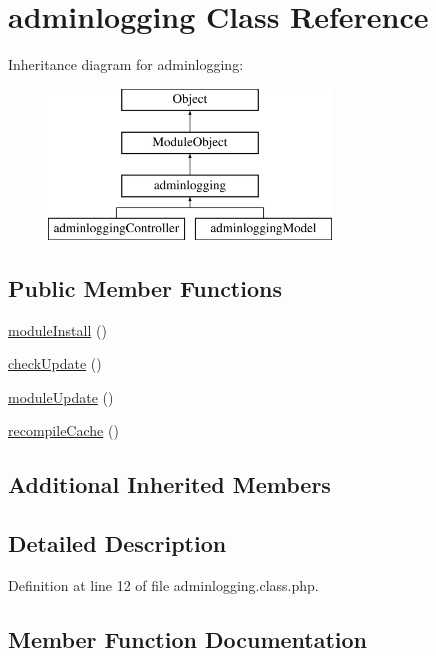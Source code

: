 \hypertarget{classadminlogging}{}\section{adminlogging Class Reference}
\label{classadminlogging}
Inheritance diagram for adminlogging\+:\begin{figure}[H]
\begin{center}
\leavevmode
\includegraphics[height=4.000000cm]{classadminlogging}
\end{center}
\end{figure}
\subsection*{Public Member Functions}
\begin{DoxyCompactItemize}
\item 
\hyperlink{classadminlogging_a177e26010673133e8a32bcb266416ff2}{module\+Install} ()
\item 
\hyperlink{classadminlogging_a982baf15267a89289d020bdfdd4ec3ec}{check\+Update} ()
\item 
\hyperlink{classadminlogging_ac07c04a3d4120d487311e4a89932c705}{module\+Update} ()
\item 
\hyperlink{classadminlogging_ad272a76b7aa666b084b7c0f6ab91b61c}{recompile\+Cache} ()
\end{DoxyCompactItemize}
\subsection*{Additional Inherited Members}


\subsection{Detailed Description}


Definition at line 12 of file adminlogging.\+class.\+php.



\subsection{Member Function Documentation}
\mbox{\label{classadminlogging_a982baf15267a89289d020bdfdd4ec3ec}} 
